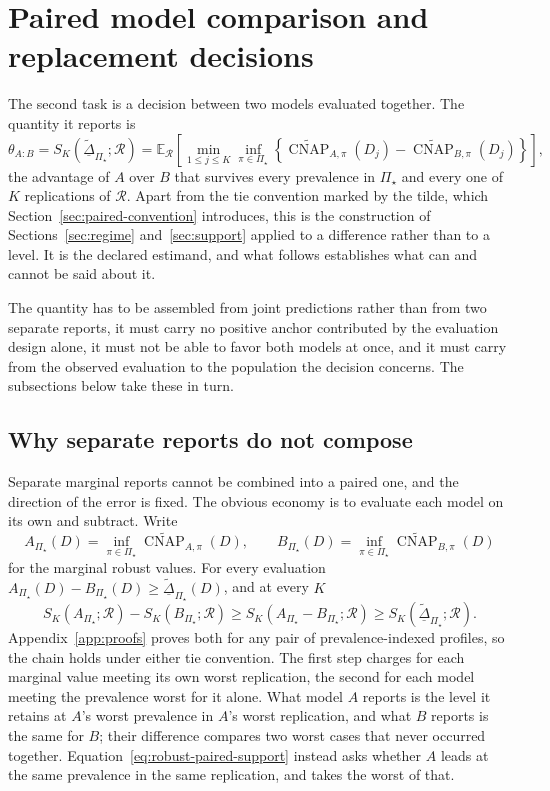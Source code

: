 \documentclass[11pt]{article}
\newcommand{\CNAP}{\operatorname{CNAP}}
\newcommand{\Regime}{\mathcal{R}}
\newcommand{\PSet}{\Pi_\star}
\newcommand{\E}{\mathbb{E}}
\newcommand{\CNAPta}{\widetilde{\CNAP}}
\newcommand{\RobDta}{\underline{\widetilde{\Delta}}_{\PSet}}
\theoremstyle{remark}
\begin{document}
\section{Paired model comparison and replacement decisions}
\label{sec:paired}

The second task is a decision between two models evaluated together. The quantity it reports is
\begin{equation}
\theta_{A:B}
=
S_K(\RobDta;\Regime)
=
\E_{\Regime}
\left[
\min_{1\leq j\leq K}
\inf_{\pi\in\PSet}
\left\{
\CNAPta_{A,\pi}(D_j)
-
\CNAPta_{B,\pi}(D_j)
\right\}
\right],
\label{eq:robust-paired-support}
\end{equation}
the advantage of $A$ over $B$ that survives every prevalence in $\PSet$ and every one of $K$ replications of $\Regime$. Apart from the tie convention marked by the tilde, which Section~\ref{sec:paired-convention} introduces, this is the construction of Sections~\ref{sec:regime} and~\ref{sec:support} applied to a difference rather than to a level. It is the declared estimand, and what follows establishes what can and cannot be said about it.

The quantity has to be assembled from joint predictions rather than from two separate reports, it must carry no positive anchor contributed by the evaluation design alone, it must not be able to favor both models at once, and it must carry from the observed evaluation to the population the decision concerns. The subsections below take these in turn.

\subsection{Why separate reports do not compose}
\label{sec:marginal}

Separate marginal reports cannot be combined into a paired one, and the direction of the error is fixed. The obvious economy is to evaluate each model on its own and subtract. Write
\[
A_{\PSet}(D)
=
\inf_{\pi\in\PSet}\CNAPta_{A,\pi}(D),
\qquad
B_{\PSet}(D)
=
\inf_{\pi\in\PSet}\CNAPta_{B,\pi}(D)
\]
for the marginal robust values. For every evaluation $A_{\PSet}(D)-B_{\PSet}(D)\geq\RobDta(D)$, and at every $K$
\begin{equation}
S_K(A_{\PSet};\Regime)
-
S_K(B_{\PSet};\Regime)
\geq
S_K(A_{\PSet}-B_{\PSet};\Regime)
\geq
S_K(\RobDta;\Regime).
\label{eq:robust-marginal-order}
\end{equation}
Appendix~\ref{app:proofs} proves both for any pair of prevalence-indexed profiles, so the chain holds under either tie convention. The first step charges for each marginal value meeting its own worst replication, the second for each model meeting the prevalence worst for it alone. What model $A$ reports is the level it retains at $A$'s worst prevalence in $A$'s worst replication, and what $B$ reports is the same for $B$; their difference compares two worst cases that never occurred together. Equation~\eqref{eq:robust-paired-support} instead asks whether $A$ leads at the same prevalence in the same replication, and takes the worst of that.
\end{document}
